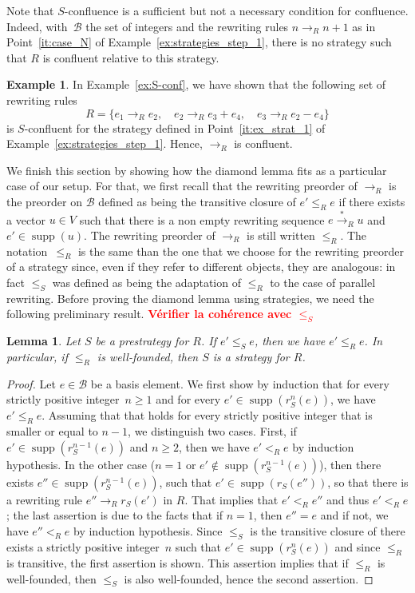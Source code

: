 \documentclass[11pt]{article}
\newtheorem{lemma}[theorem]{Lemma}
\theoremstyle{definition}
\newtheorem{example}[theorem]{Example}
\newcommand\todo[1]{{\bf\textcolor{red}{#1}}}
\newcommand\basis{\mathscr{B}}
\newcommand\ordS{\leq_S}
\newcommand\ordR{\leq_R}
\DeclareMathOperator{\supp}{supp}
\newcommand\rewR{\to_R}
\newcommand\transR{\overset{*}{\to}_R}
\begin{document}
Note that $S$-confluence is a sufficient but not a necessary condition for
confluence. Indeed, with~$\basis$ the set of integers and the rewriting rules
$n\rewR n+1$ as in Point~\ref{it:case_N} of
Example~\ref{ex:strategies_step_1}, there is no strategy such that $R$ is
confluent relative to this strategy.
\smallskip

\begin{example}\label{ex:conf}
  In Example~\ref{ex:S-conf}, we have shown that the following set of
  rewriting rules
  \[R=\{e_1\rewR e_2,\quad e_2\rewR e_3+e_4,\quad e_3\rewR e_2-e_4\}\]
  is $S$-confluent for the strategy defined in Point~\ref{it:ex_strat_1}
  of Example~\ref{ex:strategies_step_1}. Hence, $\rewR$ is confluent.
\end{example}
\smallskip

We finish this section by showing how the diamond lemma fits as a
particular case of our setup. For that, we first recall that the
rewriting preorder of $\rewR$ is the preorder on $\basis$ defined as
being the transitive closure of $e'\ordR e$ if there exists a vector
$u\in V$ such that there is a non empty rewriting sequence $e\transR u$
and $e'\in\supp(u)$. The rewriting preorder of $\rewR$ is still written
$\ordR$. The notation~$\ordR$ is the same than the one that we choose for
the rewriting preorder of a strategy since, even if they refer to
different objects, they are analogous: in fact $\ordS$ was defined as
being the adaptation of $\ordR$ to the case of parallel rewriting. Before
proving the diamond lemma using strategies, we need the following
preliminary result. \todo{Vérifier la cohérence avec $\ordS$}
\smallskip

\begin{lemma}\label{lem:rew_preorder}
  Let $S$ be a prestrategy for $R$. If $e'\ordS e$, then we have
  $e'\ordR e$. In particular, if $\ordR$ is well-founded, then $S$ is a
  strategy for $R$.
\end{lemma}


\begin{proof}
  Let $e\in\basis$ be a basis element. We first show by induction that
  for every strictly positive integer~$n\geq 1$ and for every
  $e'\in\supp(r_S^n(e))$, we have $e'\ordR e$. Assuming that that holds
  for every strictly positive integer that is smaller or equal to $n-1$,
  we distinguish two cases. First, if $e'\in\supp(r_S^{n-1}(e))$ and
  $n\geq 2$, then we have $e'<_Re$ by induction hypothesis. In the other
  case ($n=1$ or $e'\notin\supp(r_S^{n-1}(e))$), then there exists
  $e''\in\supp(r_S^{n-1}(e))$, such that $e'\in\supp(r_S(e''))$, so that
  there is a rewriting rule $e''\rewR r_S(e')$ in $R$. That implies that
  $e'<_Re''$ and thus $e'<_Re$; the last assertion is due to the facts
  that if $n=1$, then $e''=e$ and if not, we have $e''<_Re$ by induction
  hypothesis. Since $\ordS$ is the transitive closure of there exists a
  strictly positive integer~$n$ such that $e'\in\supp(r_S^n(e))$ and
  since $\ordR$ is transitive, the first assertion is shown. This
  assertion implies that if $\ordR$ is well-founded, then $\ordS$ is also
  well-founded, hence the second assertion.
\end{proof}
\smallskip
\end{document}
